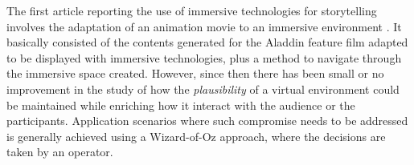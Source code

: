 \documentclass[
		twoside,openright,titlepage,numbers=noenddot,manychapters,
		headinclude,%
                footinclude=false,cleardoublepage=empty,
                BCOR=5mm,
		fontsize=11pt, %
                 enabledeprecatedfontcommands]{scrreprt}
\begin{document}
The first article reporting the use of immersive technologies for storytelling involves the adaptation of an animation movie to an immersive environment  \cite[]{disney_alladin}. It basically consisted of the contents generated for the Aladdin feature film adapted to be displayed with immersive technologies, plus a method to navigate through the immersive space created. 
However, since then there has been small or no improvement in the study of how the \emph{plausibility} of a virtual environment could be maintained while enriching how it interact with the audience or the participants.%
Application scenarios where such compromise needs to be addressed is generally achieved using a Wizard-of-Oz approach, where the decisions are taken by an operator.
\end{document}
